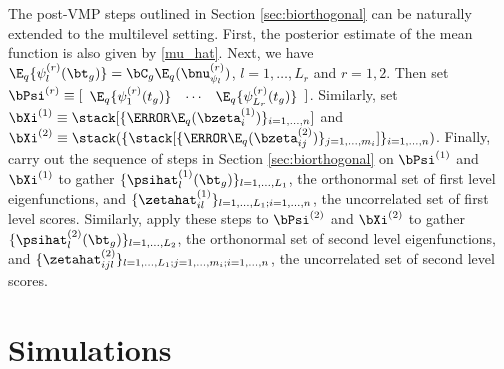 \documentclass[ba]{imsart}
\numberwithin{equation}{section}
\theoremstyle{plain}
\newcommand\bzetaL[2]{\bzeta^{(#1)}_{#2}}
\newcommand\psiL[2]{\psi^{(#1)}_{#2}}
\newcommand\nupsiL[2]{\bnu^{(#1)}_{\psi_{#2}}}
\newcommand\bPsiL[1]{\bPsi^{(#1)}}
\newcommand\bXiL[1]{\bXi^{(#1)}}
\begin{document}
The post-VMP steps outlined in Section \ref{sec:biorthogonal} can be naturally extended to the multilevel setting.
First, the posterior estimate of the mean function is also given by \eqref{mu_hat}. Next, we have
$\E_q \{ \psiL{r}{l} (\bt_g) \} = \bC_g \E_q (\nupsiL{r}{l})$, $l = 1, \dots, L_r$ and $r = 1, 2$. Then set
$\bPsiL{r} \equiv [\begin{array}{ccc} \E_q \{ \psiL{r}{1} (t_g) \} & \cdots & \E_q \{ \psiL{r}{L_r} (t_g) \} \end{array}]$.
Similarly, set $\bXiL{1} \equiv \stack [ \{ \T{\E_q (\bzetaL{1}{i})} \}_{i = 1, \dots, n} ]$ and
$\bXiL{2} \equiv \stack ( \{ \stack [ \{ \T{\E_q (\bzetaL{2}{ij})} \}_{j = 1, \dots, m_i} ] \}_{i = 1, \dots, n} )$.
Finally, carry out the sequence of steps in Section \ref{sec:biorthogonal} on $\bPsiL{1}$ and $\bXiL{1}$ to
gather $\{ \psihat^{(1)}_l (\bt_g) \}_{l = 1, ..., L_1}$, the orthonormal set of first level eigenfunctions, and
$\{ \zetahat^{(1)}_{il} \}_{l = 1, \dots, L_1; i = 1, \dots, n}$,
the uncorrelated set of first level scores. Similarly, apply these steps to $\bPsiL{2}$ and $\bXiL{2}$ to
gather $\{ \psihat^{(2)}_l (\bt_g) \}_{l = 1, ..., L_2}$, the orthonormal set of second level eigenfunctions, and
$\{ \zetahat^{(2)}_{ijl} \}_{l = 1, \dots, L_1; j = 1, \dots, m_i; i = 1, \dots, n}$,
the uncorrelated set of second level scores.


\section{Simulations}
\label{sec:sims}
\end{document}

